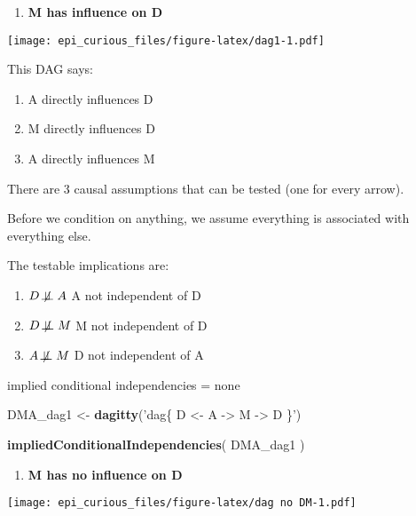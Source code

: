 \documentclass[
]{article}
\newenvironment{Shaded}{\begin{snugshade}}{\end{snugshade}}
\newcommand{\KeywordTok}[1]{\textcolor[rgb]{0.13,0.29,0.53}{\textbf{#1}}}
\newcommand{\NormalTok}[1]{#1}
\newcommand{\StringTok}[1]{\textcolor[rgb]{0.31,0.60,0.02}{#1}}
\providecommand{\tightlist}{%
  \setlength{\itemsep}{0pt}\setlength{\parskip}{0pt}}
\begin{document}
\begin{enumerate}
\def\labelenumi{\arabic{enumi}.}
\tightlist
\item
  \textbf{M has influence on D}
\end{enumerate}

\texttt{[image: epi\_curious\_files/figure-latex/dag1-1.pdf]}

This DAG says:

\begin{enumerate}
\def\labelenumi{(\arabic{enumi})}
\tightlist
\item
  A directly influences D
\item
  M directly influences D
\item
  A directly influences M
\end{enumerate}

There are 3 causal assumptions that can be tested (one for every arrow).

Before we condition on anything, we assume everything is associated with
everything else.

The testable implications are:

\begin{enumerate}
\def\labelenumi{(\arabic{enumi})}
\tightlist
\item
  \(D \not\!\perp\!\!\!\perp A\) A not independent of D
\item
  \(D \not\!\perp\!\!\!\perp M\) M not independent of D
\item
  \(A \not\!\perp\!\!\!\perp M\) D not independent of A
\end{enumerate}

implied conditional independencies = none

\begin{Shaded}
\begin{Highlighting}[]
\NormalTok{DMA_dag1 <-}\StringTok{ }\KeywordTok{dagitty}\NormalTok{(}\StringTok{'dag\{ D <- A -> M -> D \}'}\NormalTok{)}

\KeywordTok{impliedConditionalIndependencies}\NormalTok{( DMA_dag1  )}
\end{Highlighting}
\end{Shaded}

\begin{enumerate}
\def\labelenumi{\arabic{enumi}.}
\setcounter{enumi}{1}
\tightlist
\item
  \textbf{M has no influence on D}
\end{enumerate}

\texttt{[image: epi\_curious\_files/figure-latex/dag no DM-1.pdf]}
\end{document}
